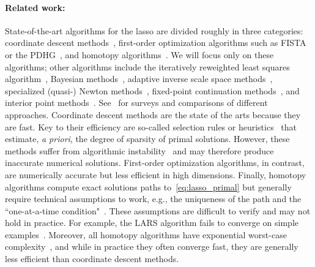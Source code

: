 \documentclass[11pt]{article}
\numberwithin{prop}{section}
\numberwithin{lem}{section}
\numberwithin{rem}{section}
\numberwithin{cor}{section}
\numberwithin{thm}{section}
\numberwithin{defn}{section}
\numberwithin{fact}{section}
\theoremstyle{plain}
\begin{document}
\paragraph{Related work:} State-of-the-art algorithms for the lasso are divided roughly in three categories: coordinate descent methods~\cite{friedman2007pathwise,wu2008coordinate,friedman2010regularization,tibshirani2012strong}, first-order optimization algorithms such as FISTA or the PDHG~\cite{glowinski1975approximation,yin2008bregman,beck2009fast,chambolle2011first,chambolle2016introduction}, and homotopy algorithms~\cite{osborne2000new,osborne2000lasso,efron2004least,donoho2008fast,tibshirani2013lasso,bringmann2018homotopy}. We will focus only on these algorithms; other algorithms include the iteratively reweighted least squares algorithm~\cite{daubechies2004iterative}, Bayesian methods~\cite{park2008bayesian}, adaptive inverse scale space methods~\cite{burger2013adaptive}, specialized (quasi-) Newton methods~\cite{karimi2017imro}, fixed-point continuation methods~\cite{hale2008fixed}, and interior point methods~\cite{boyd2004convex}. See~\cite{zhao2023survey,bertsimas2020,li2020survey} for surveys and comparisons of different approaches. Coordinate descent methods are the state of the arts because they are fast. Key to their efficiency are so-called selection rules or heuristics~\cite{tibshirani2012strong,ghaoui2010safe,raj2016screening} that estimate, \textit{a priori}, the degree of sparsity of primal solutions. However, these methods suffer from algorithmic instability~\cite{barber2021stability} and may therefore produce inaccurate numerical solutions. First-order optimization algorithms, in contrast, are numerically accurate but less efficient in high dimensions. Finally, homotopy algorithms compute exact solutions paths to~\eqref{eq:lasso_primal} but generally require technical assumptions to work, e.g., the uniqueness of the path and the ``one-at-a-time condition"~\cite{tibshirani2013lasso,efron2004least,osborne2000new}. These assumptions are difficult to verify and may not hold in practice. For example, the LARS algorithm fails to converge on simple examples~\cite[Proposition 4.1]{bringmann2018homotopy}. Moreover, all homotopy algorithms have exponential worst-case complexity~\cite{mairal2012complexity}, and while in practice they often converge fast, they are generally less efficient than coordinate descent methods.
\end{document}
